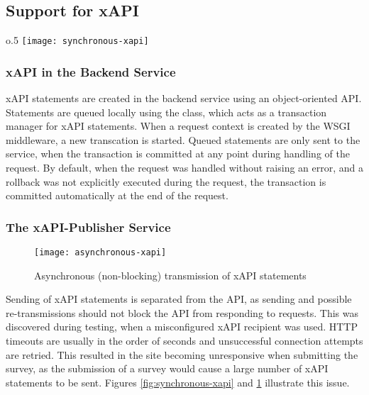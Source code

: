 \subsection{Support for xAPI}

        \begin{wrapfigure}{o}{.5\textwidth}
            \centering
            \texttt{[image: synchronous-xapi]}
            \caption{Synchronous (blocking) transmission of xAPI statements}
            \label{fig:synchronous-xapi}
        \end{wrapfigure}
        
    \subsubsection{xAPI in the Backend Service}
        xAPI statements are created in the backend service using an
        object-oriented API. Statements are queued locally using
        the  class, which acts as a transaction manager
        for xAPI statements. When a request context is created by the
        WSGI middleware, a new transcation is started. 
        Queued statements are only sent to the  service, 
        when the transaction is committed at any point during handling 
        of the request. By default, when the request was handled
        without raising an error, and a rollback was not explicitly
        executed during the request, the transaction is committed automatically
        at the end of the request.

    \subsubsection{The xAPI-Publisher Service}

        \begin{figure}
            \centering
            \texttt{[image: asynchronous-xapi]}
            \caption{Asynchronous (non-blocking) transmission of xAPI statements}
            \label{fig:asynchronous-xapi}
        \end{figure}

        Sending of xAPI statements is separated from the API, as sending and
        possible re-transmissions should not block the API from responding
        to requests. This was discovered during testing, when a misconfigured xAPI
        recipient was used. HTTP timeouts are usually in the order of seconds and 
        unsuccessful connection attempts are retried. This resulted in
        the site becoming unresponsive when submitting the survey, as the submission
        of a survey would cause a large number of xAPI statements to be sent.
        Figures \ref{fig:synchronous-xapi} and \ref{fig:asynchronous-xapi} illustrate
        this issue.

